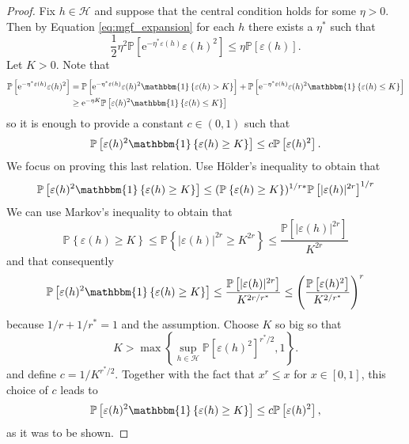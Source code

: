 \documentclass{uvamath}
\newcommand*{\calH}{\mathcal{H}}
\newcommand*{\bbP}{\mathbb{P}}
\newcommand*{\prob}[2][]{\mathbb{P}_{#1}\left\{#2\right\}}
\newcommand*{\expv}[1]{\mathbb{P}\left[#1\right]}
\newcommand*{\indicator}[1]{\mathbbm{1}\left\{#1\right\}}
\newcommand*{\bracks}[1]{\left\{#1\right\}}
\newcommand*{\paren}[1]{\left(#1\right)}
\newcommand*{\rme}{\mathrm{e}}
\theoremstyle{remark}
\theoremstyle{definition}
\theoremstyle{definition}
\theoremstyle{definition}
\theoremstyle{definition}
\theoremstyle{definition}
\begin{document}
\begin{proof}
  Fix $h\in\calH$ and suppose that the central condition holds for
  some $\eta>0$. Then by Equation \eqref{eq:mgf_expansion} for each
  $h$ there exists a $\eta^*$ such that
  \begin{equation*}
    \frac{1}{2}\eta^2\bbP[\rme^{-\eta^*\varepsilon(h)}\varepsilon(h)^2] \leq \eta\bbP[ \varepsilon(h)].
  \end{equation*}
  Let $K>0$. Note that
  \begin{align*}
    \expv{\rme^{-\eta^* \varepsilon(h)}\varepsilon(h)^2} &=
    \expv{\rme^{-\eta^* \varepsilon(h)}\varepsilon(h)^2\indicator{\varepsilon(h)>K}} +
    \expv{\rme^{-\eta^*
    \varepsilon(h)}\varepsilon(h)^2\indicator{\varepsilon(h)\leq K}}\\
    &\geq
     \rme^{-\eta K}\expv{\varepsilon(h)^2\indicator{\varepsilon(h)\leq K}}
  \end{align*}
  so it is enough to provide a constant $c\in(0,1)$ such that
  \begin{equation*}
    \expv{\varepsilon(h)^2\indicator{\varepsilon(h)\geq K}}\leq c\expv{\varepsilon(h)^2}.
  \end{equation*}
  We focus on proving this last relation. Use Hölder's inequality to
  obtain that
  \begin{equation*}
    \expv{\varepsilon(h)^2\indicator{\varepsilon(h)\geq K}}
    \leq
    (\prob{\varepsilon(h)\geq K})^{1/r*}\expv{|\varepsilon(h)|^{2r}}^{1/r}
  \end{equation*}
  We can use Markov's inequality to obtain that
  \begin{equation*}
    \prob{\varepsilon(h)\geq K}
    \leq
    \prob{|\varepsilon(h)|^{2r}\geq K^{2r}} \leq \frac{\bbP[|\varepsilon(h)|^{2r}]}{K^{2r}}
  \end{equation*}
  and that consequently
  \begin{equation*}
    \expv{\varepsilon(h)^2\indicator{\varepsilon(h)\geq K}}
    \leq
    \frac{\expv{|\varepsilon(h)|^{2r}}}{K^{2r/r^*}}
      \leq
      \paren{\frac{\expv{\varepsilon(h)^{2}}}{K^{2/r^*}} }^r
  \end{equation*}
  because $1/r + 1/r^* = 1$ and the assumption. Choose $K$ so big so
  that
  \begin{equation*}
    K > \max\bracks{\sup_{h\in\calH}\expv{\varepsilon(h)^{2}}^{r^*/2} , 1}.
  \end{equation*}
  and define $c = 1/K^{r^*/2}$. Together with the fact that
  $x^r\leq x$ for $x\in[0,1]$, this choice of $c$ leads to
  \begin{equation*}
    \expv{\varepsilon(h)^2\indicator{\varepsilon(h)\geq K}}
    \leq c\expv{\varepsilon(h)^{2}},
  \end{equation*}
  as it was to be shown.
\end{proof}
\end{document}
